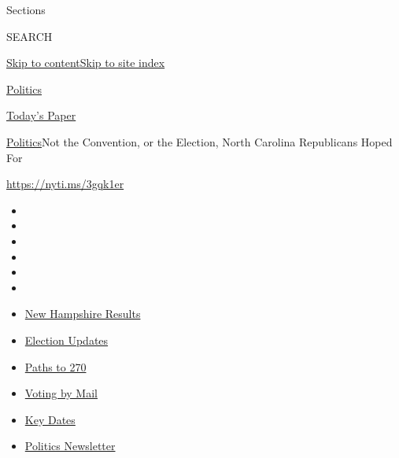 Sections

SEARCH

\protect\hyperlink{site-content}{Skip to
content}\protect\hyperlink{site-index}{Skip to site index}

\href{https://www.nytimes3xbfgragh.onion/section/politics}{Politics}

\href{https://myaccount.nytimes3xbfgragh.onion/auth/login?response_type=cookie\&client_id=vi}{}

\href{https://www.nytimes3xbfgragh.onion/section/todayspaper}{Today's
Paper}

\href{/section/politics}{Politics}\textbar{}Not the Convention, or the
Election, North Carolina Republicans Hoped For

\url{https://nyti.ms/3gqk1er}

\begin{itemize}
\item
\item
\item
\item
\item
\item
\end{itemize}

\begin{itemize}
\item
  \href{https://www.nytimes3xbfgragh.onion/interactive/2020/09/08/us/elections/results-new-hampshire-primary-elections.html?action=click\&pgtype=Article\&state=default\&region=TOP_BANNER\&context=storylines_menu}{New
  Hampshire Results}
\item
  \href{https://www.nytimes3xbfgragh.onion/live/2020/09/08/us/trump-vs-biden?action=click\&pgtype=Article\&state=default\&region=TOP_BANNER\&context=storylines_menu}{Election
  Updates}
\item
  \href{https://www.nytimes3xbfgragh.onion/interactive/2020/us/elections/election-states-biden-trump.html?action=click\&pgtype=Article\&state=default\&region=TOP_BANNER\&context=storylines_menu}{Paths
  to 270}
\item
  \href{https://www.nytimes3xbfgragh.onion/interactive/2020/08/31/us/politics/vote-by-mail-deadlines.html?action=click\&pgtype=Article\&state=default\&region=TOP_BANNER\&context=storylines_menu}{Voting
  by Mail}
\item
  \href{https://www.nytimes3xbfgragh.onion/interactive/2019/us/elections/2020-presidential-election-calendar.html?action=click\&pgtype=Article\&state=default\&region=TOP_BANNER\&context=storylines_menu}{Key
  Dates}
\item
  \href{https://www.nytimes3xbfgragh.onion/newsletters/politics?action=click\&pgtype=Article\&state=default\&region=TOP_BANNER\&context=storylines_menu}{Politics
  Newsletter}
\end{itemize}

